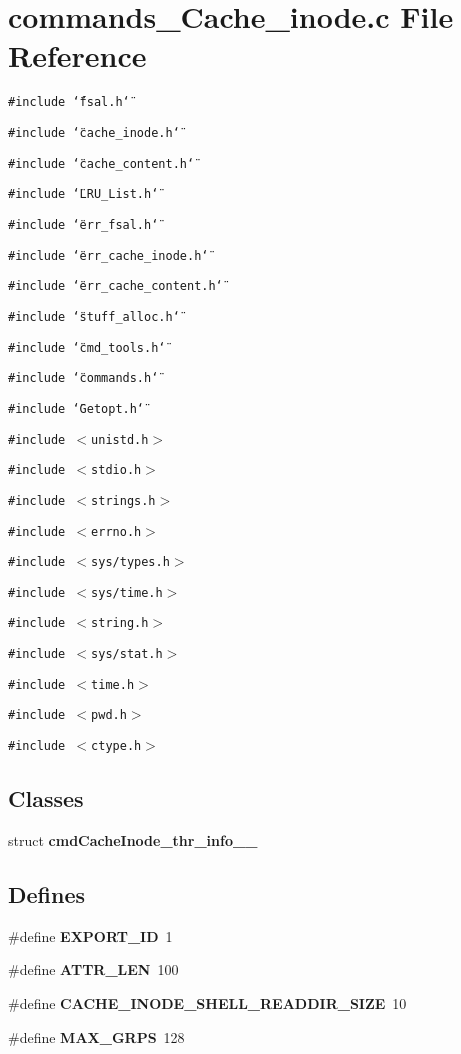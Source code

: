 \section{commands\_\-Cache\_\-inode.c File Reference}
\label{commands__Cache__inode_8c}
{\tt \#include \char`\"{}fsal.h\char`\"{}}\par
{\tt \#include \char`\"{}cache\_\-inode.h\char`\"{}}\par
{\tt \#include \char`\"{}cache\_\-content.h\char`\"{}}\par
{\tt \#include \char`\"{}LRU\_\-List.h\char`\"{}}\par
{\tt \#include \char`\"{}err\_\-fsal.h\char`\"{}}\par
{\tt \#include \char`\"{}err\_\-cache\_\-inode.h\char`\"{}}\par
{\tt \#include \char`\"{}err\_\-cache\_\-content.h\char`\"{}}\par
{\tt \#include \char`\"{}stuff\_\-alloc.h\char`\"{}}\par
{\tt \#include \char`\"{}cmd\_\-tools.h\char`\"{}}\par
{\tt \#include \char`\"{}commands.h\char`\"{}}\par
{\tt \#include \char`\"{}Getopt.h\char`\"{}}\par
{\tt \#include $<$unistd.h$>$}\par
{\tt \#include $<$stdio.h$>$}\par
{\tt \#include $<$strings.h$>$}\par
{\tt \#include $<$errno.h$>$}\par
{\tt \#include $<$sys/types.h$>$}\par
{\tt \#include $<$sys/time.h$>$}\par
{\tt \#include $<$string.h$>$}\par
{\tt \#include $<$sys/stat.h$>$}\par
{\tt \#include $<$time.h$>$}\par
{\tt \#include $<$pwd.h$>$}\par
{\tt \#include $<$ctype.h$>$}\par
\subsection*{Classes}
\begin{CompactItemize}
\item 
struct {\bf cmd\-Cache\-Inode\_\-thr\_\-info\_\-\_\-}
\end{CompactItemize}
\subsection*{Defines}
\begin{CompactItemize}
\item 
\#define {\bf EXPORT\_\-ID}\ 1
\item 
\#define {\bf ATTR\_\-LEN}\ 100
\item 
\#define {\bf CACHE\_\-INODE\_\-SHELL\_\-READDIR\_\-SIZE}\ 10
\item 
\#define {\bf MAX\_\-GRPS}\ 128
\end{CompactItemize}
